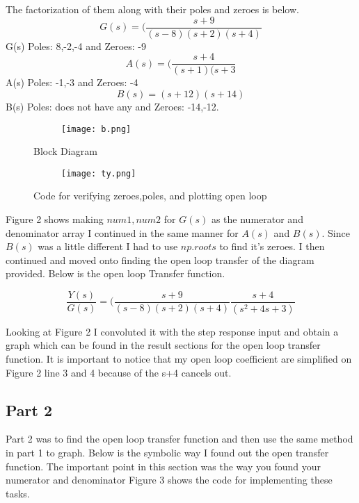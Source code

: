 \documentclass[12pt,a4paper]{article}
\begin{document}
The factorization of them along with their poles and zeroes is below.
\[G(s) = (\frac{s+9}{(s-8)(s+2)(s+4)} \]   G(s) Poles: 8,-2,-4 and Zeroes: -9
\[A(s) = (\frac{s+4}{(s+1)(s+3} \]  A(s) Poles: -1,-3 and Zeroes: -4
\[B(s) = (s+12)(s+14) \]   B(s) Poles: does not have any and Zeroes: -14,-12.
 

 
\begin{figure}[h]
\begin{subfigure}{ 1\textwidth}
\texttt{[image: b.png]}
\end{subfigure}
\caption{Block Diagram}
\label{fig:image2}
\end{figure}
\clearpage

\begin{figure}[h]
\begin{subfigure}{ 1\textwidth}
\texttt{[image: ty.png]}
\end{subfigure}
\caption{Code for verifying zeroes,poles, and plotting open loop}
\label{fig:image2}
\end{figure}
\clearpage

Figure 2 shows making $num1,num2$ for $G(s)$ as the numerator and denominator array I continued in the same manner for $A(s)$ and $B(s)$. Since $B(s)$ was a little different I had to use $np.roots$ to find it's zeroes. I then continued and moved onto finding the open loop transfer of the diagram provided. Below is the open loop Transfer function.


\[ \frac{Y(s)}{G(s)} = (\frac{s+9}{(s-8)(s+2)(s+4)}\frac{s+4}{(s^2+4s+3)} \]   

Looking at Figure 2 I convoluted it with the step response input and obtain a graph which can be found in the result sections for the open loop transfer function. It is important to notice that my open loop coefficient are simplified on Figure 2 line 3 and 4 because of the s+4 cancels out.



\subsection{Part 2}
Part 2 was to find the open loop transfer function and then use the same method in part 1 to graph. Below is the symbolic way I found out the open transfer function. The important point in this section was the way you found your numerator and denominator Figure 3 shows the code for implementing these tasks.
\end{document}
